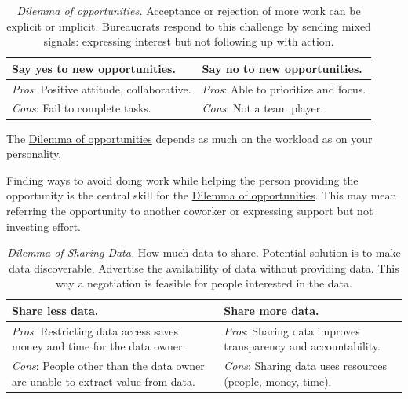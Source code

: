 \begin{center}
\begin{table}[H] %
\begin{tabular}{ | m{\dilemmatablewidth}| m{\dilemmatablewidth} | } 
  \hline
  \textbf{Say yes to new opportunities.} & 
  \textbf{Say no to new opportunities.} \\ 
  \hline
  \textit{Pros}: Positive attitude, collaborative. &
  \textit{Pros}: Able to prioritize and focus. \\
  \hline
  \textit{Cons}: Fail to complete tasks. &
  \textit{Cons}: Not a team player. \\  
  \hline
\end{tabular}
\caption{
\textit{Dilemma of opportunities.}
Acceptance or rejection of more work can be explicit or implicit. Bureaucrats respond to this challenge by sending mixed signals: expressing interest but not following up with action.
}
\label{table:new-opportunties}
\end{table}
\end{center}

The \hyperref[table:new-opportunties]{Dilemma of opportunities} depends as much on the workload as on your personality. 

Finding ways to avoid doing work while helping the person providing the opportunity is the central skill for the \hyperref[table:new-opportunties]{Dilemma of opportunities}. This may mean referring the opportunity to another coworker or expressing support but not investing effort. 



\begin{center}
\begin{table}[H] %
\begin{tabular}{ | m{\dilemmatablewidth}| m{\dilemmatablewidth} | } 
  \hline
  \textbf{Share less data.} &
  \textbf{Share more data.} \\
  \hline
  \textit{Pros}: Restricting data access saves money and time for the data owner.&
  \textit{Pros}: Sharing data improves transparency and accountability. \\
  \hline
  \textit{Cons}: People other than the data owner are unable to extract value from data. & 
  \textit{Cons}: Sharing data uses resources (people, money, time). \\
  \hline
\end{tabular}
\caption{
\textit{Dilemma of Sharing Data.}
How much data to share. Potential solution is to make data discoverable. Advertise the availability of data without providing data. This way a negotiation is feasible for people interested in the data.
}
\label{table:data-share-vs-hide}
\end{table}
\end{center}

